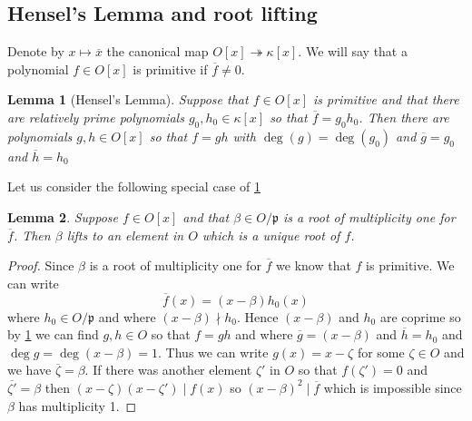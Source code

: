 \documentclass{article}
\newtheorem{lemma}{Lemma}[section]
\newcommand{\mfrak}[1]{\mathfrak{#1}}
\numberwithin{equation}{section}
\begin{document}
\subsection{Hensel's Lemma and root lifting}

Denote by $x \mapsto \overline{x}$ the canonical map $O[x] \twoheadrightarrow \kappa[x]$. We will say that a polynomial $f \in O[x]$ is primitive if $\overline f \neq 0$. 

\begin{lemma}[Hensel's Lemma]\label{lem: Hensel lemma}
    Suppose that $f \in O[x]$ is primitive and that there are relatively prime polynomials $g_0,h_0 \in \kappa[x]$ so that $\overline f = g_0 h_0$. Then there are polynomials $g,h \in O[x]$ so that $f = gh$ with $\deg(g) = \deg(g_0)$ and $\overline g = g_0$ and $\overline h = h_0$
\end{lemma}

Let us consider the following special case of \cref{lem: Hensel lemma}
\begin{lemma} \label{lem: Root lifting}
    Suppose $f \in O[x]$ and that $\beta \in O/\mfrak p$ is a root of multiplicity one for $\overline f$. Then $\beta$ lifts to an element in $O$ which is a unique root of $f$. 
\end{lemma}
\begin{proof}
    Since $\beta$ is a root of multiplicity one for $\overline f$ we know that $f$ is primitive. We can write
    $$\overline f(x) = (x - \beta)h_0(x)$$
    where $h_0 \in O/\mfrak p$ and where $(x-\beta) \nmid h_0$. Hence $(x-\beta)$ and $h_0$ are coprime so by \cref{lem: Hensel lemma} we can find $g,h \in O$ so that $f = g h$ and where $\overline g = (x-\beta)$ and $\overline h = h_0$ and $\deg g = \deg (x - \beta) = 1$. Thus we can write $g(x) = x - \zeta$ for some $\zeta \in O$ and we have $\overline \zeta = \beta$. If there was another element $\zeta'$ in $O$ so that $f(\zeta') = 0$ and $\overline {\zeta'} = \beta$ then $(x-\zeta)(x-\zeta') \mid f(x)$ so $(x-\beta)^2 \mid  \overline f$ which is impossible since $\beta$ has multiplicity 1. 
\end{proof}
 
\end{document}
